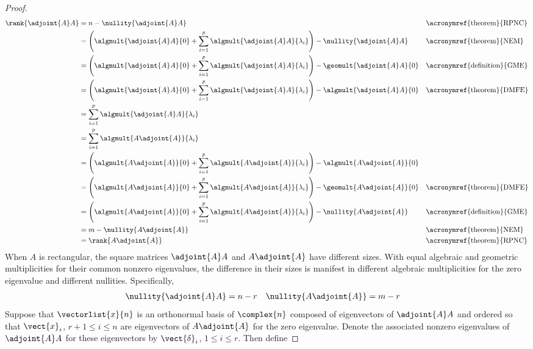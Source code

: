 \begin{proof}
%
\begin{align*}
\rank{\adjoint{A}A}
&=n-\nullity{\adjoint{A}A}&&\text{\acronymref{theorem}{RPNC}}\\
%
&=\left(\algmult{\adjoint{A}A}{0} + \sum_{i=1}^{p}\algmult{\adjoint{A}A}{\lambda_i}\right)-\nullity{\adjoint{A}A}
&&\text{\acronymref{theorem}{NEM}}\\
%
&=\left(\algmult{\adjoint{A}A}{0} + \sum_{i=1}^{p}\algmult{\adjoint{A}A}{\lambda_i}\right)-\geomult{\adjoint{A}A}{0}
&&\text{\acronymref{definition}{GME}}\\
%
&=\left(\algmult{\adjoint{A}A}{0} + \sum_{i=1}^{p}\algmult{\adjoint{A}A}{\lambda_i}\right)-\algmult{\adjoint{A}A}{0}
&&\text{\acronymref{theorem}{DMFE}}\\
%
&=\sum_{i=1}^{p}\algmult{\adjoint{A}A}{\lambda_i}\\
%
&=\sum_{i=1}^{p}\algmult{A\adjoint{A}}{\lambda_i}\\
%
&=\left(\algmult{A\adjoint{A}}{0} + \sum_{i=1}^{p}\algmult{A\adjoint{A}}{\lambda_i}\right)-\algmult{A\adjoint{A}}{0}\\
%
&=\left(\algmult{A\adjoint{A}}{0} + \sum_{i=1}^{p}\algmult{A\adjoint{A}}{\lambda_i}\right)-\geomult{A\adjoint{A}}{0}
&&\text{\acronymref{theorem}{DMFE}}\\
%
&=\left(\algmult{A\adjoint{A}}{0} + \sum_{i=1}^{p}\algmult{A\adjoint{A}}{\lambda_i}\right)-\nullity{A\adjoint{A}}
&&\text{\acronymref{definition}{GME}}\\
%
&=m-\nullity{A\adjoint{A}}&&\text{\acronymref{theorem}{NEM}}\\
%
&=\rank{A\adjoint{A}}&&\text{\acronymref{theorem}{RPNC}}
%
\end{align*}
%
When $A$ is rectangular, the square matrices $\adjoint{A}A$ and $A\adjoint{A}$ have different sizes.  With equal algebraic and geometric multiplicities for their common nonzero eigenvalues, the difference in their sizes is manifest in different algebraic multiplicities for the zero eigenvalue and different nullities.  Specifically,
%
\begin{align*}
\nullity{\adjoint{A}A}&=n-r
&
\nullity{A\adjoint{A}}&=m-r
\end{align*}
%
Suppose that $\vectorlist{x}{n}$ is an orthonormal basis of $\complex{n}$ composed of eigenvectors of $\adjoint{A}A$ and ordered so that $\vect{x}_i$, $r+1\leq i\leq n$ are eigenvectors of $A\adjoint{A}$ for the zero eigenvalue.  Denote the associated nonzero eigenvalues of $\adjoint{A}A$ for these eigenvectors by $\vect{\delta}_i$, $1\leq i\leq r$.   Then define 

\end{proof}
